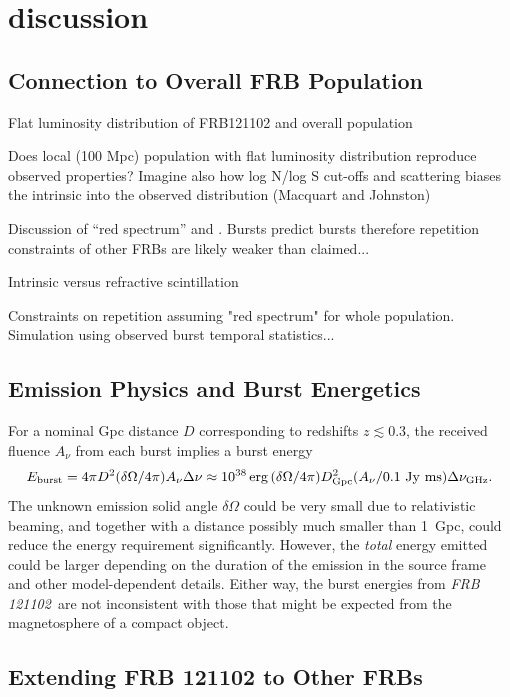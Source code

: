 \documentclass{emulateapj}
\newcommand{\frb}{\emph{FRB 121102}}
\begin{document}
\section{discussion}

\subsection{Connection to Overall FRB Population}

Flat luminosity distribution of FRB121102 and overall population

Does local (100 Mpc) population with flat luminosity distribution reproduce observed properties? Imagine also how log N/log S cut-offs and scattering biases the intrinsic into the observed distribution (Macquart and Johnston)

Discussion of ``red spectrum'' and \citet{2016MNRAS.458L..89C}. Bursts predict bursts therefore repetition constraints of other FRBs are likely weaker than claimed...

Intrinsic versus refractive scintillation

Constraints on repetition assuming "red spectrum" for whole population. Simulation using observed burst temporal statistics...


\subsection{Emission Physics and Burst Energetics}

For a nominal Gpc distance $D$ corresponding to redshifts $z\lesssim 0.3$, the received fluence $A_{\nu}$ from each burst implies  a burst energy
$$E_{\rm burst} = 4\pi D^2 (\delta\Omega/4\pi) A_{\nu} \Delta\nu
\approx 10^{38}\, {\rm erg}\,(\delta\Omega/4\pi) D_{\rm Gpc}^2  (A_{\nu} / 0.1\ {\rm Jy\ ms}) \Delta\nu_{\rm GHz}.$$
The unknown  emission solid angle $\delta\Omega$
could be very small due to relativistic beaming, and together with a distance possibly much smaller than 1~Gpc, could reduce the energy requirement significantly.  However, the {\it total} energy emitted could be larger depending on the duration of the emission in the source frame and other model-dependent details.
Either way, the burst energies from \frb\ are not inconsistent with those that might be expected from the magnetosphere of a compact object\cite{cw16}.

\subsection{Extending FRB 121102 to Other FRBs}
\end{document}
